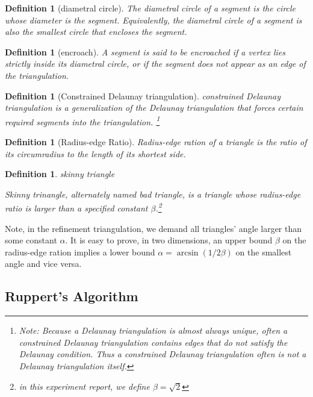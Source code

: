 \documentclass[letterpaper,12pt]{article}
\newtheorem{definition}[lemma]{Definition}
\begin{document}
\begin{definition}[diametral circle] 

The diametral circle of a segment is the circle whose diameter
is the segment. Equivalently, the diametral circle of a segment is also the smallest circle that
encloses the segment.

\end{definition}

\begin{definition}[encroach] 

A segment is said to be encroached if a vertex lies strictly inside its
diametral circle, or if the segment does not appear as an edge of the triangulation.

\end{definition}

\begin{definition}[Constrained Delaunay triangulation]

 constrained Delaunay triangulation is a
generalization of the Delaunay triangulation that forces certain required segments into the
triangulation. \footnote{Note: Because a Delaunay triangulation is almost always unique, often a
constrained Delaunay triangulation contains edges that do not satisfy the Delaunay condition. Thus a
constrained Delaunay triangulation often is not a Delaunay triangulation itself.}

\end{definition}

\begin{definition}[Radius-edge Ratio]

 Radius-edge ration of a triangle is the ratio of its
circumradius to the length of its shortest side.
\end{definition}

\begin{definition}{skinny triangle} 

Skinny trinangle, alternately named bad triangle, is a triangle
whose radius-edge ratio is larger than a specified constant $\beta$.\footnote{in this experiment
report, we define $\beta=\sqrt{2}$}
\end{definition}


Note, in the refinement triangulation, we demand all triangles' angle larger than some constant
$\alpha$. It is easy to prove, in two dimensions, an upper bound $\beta$ on the radius-edge ration
implies a lower bound $\alpha = \arcsin(1/2\beta)$ on the smallest angle and vice versa.

\subsection{Ruppert's Algorithm}
\label{sec:01:02}
\end{document}
